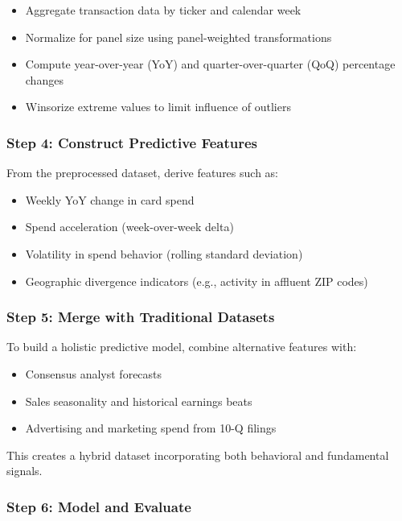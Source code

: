 \begin{itemize}
    \item Aggregate transaction data by ticker and calendar week
    \item Normalize for panel size using panel-weighted transformations
    \item Compute year-over-year (YoY) and quarter-over-quarter (QoQ) percentage changes
    \item Winsorize extreme values to limit influence of outliers
\end{itemize}

\subsubsection{Step 4: Construct Predictive Features}

From the preprocessed dataset, derive features such as:

\begin{itemize}
    \item Weekly YoY change in card spend
    \item Spend acceleration (week-over-week delta)
    \item Volatility in spend behavior (rolling standard deviation)
    \item Geographic divergence indicators (e.g., activity in affluent ZIP codes)
\end{itemize}

\subsubsection{Step 5: Merge with Traditional Datasets}

To build a holistic predictive model, combine alternative features with:

\begin{itemize}
    \item Consensus analyst forecasts
    \item Sales seasonality and historical earnings beats
    \item Advertising and marketing spend from 10-Q filings
\end{itemize}

This creates a hybrid dataset incorporating both behavioral and fundamental signals.

\subsubsection{Step 6: Model and Evaluate}


